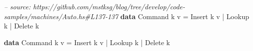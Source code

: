 \documentclass[]{article}
\newenvironment{Shaded}{}{}
\newcommand{\KeywordTok}[1]{\textcolor[rgb]{0.00,0.44,0.13}{\textbf{{#1}}}}
\newcommand{\DataTypeTok}[1]{\textcolor[rgb]{0.56,0.13,0.00}{{#1}}}
\newcommand{\CommentTok}[1]{\textcolor[rgb]{0.38,0.63,0.69}{\textit{{#1}}}}
\newcommand{\FunctionTok}[1]{\textcolor[rgb]{0.02,0.16,0.49}{{#1}}}
\newcommand{\NormalTok}[1]{{#1}}
\begin{document}
\begin{Shaded}
\begin{Highlighting}[]
\CommentTok{-- source: https://github.com/mstksg/blog/tree/develop/code-samples/machines/Auto.hs#L137-137}
\KeywordTok{data} \DataTypeTok{Command} \NormalTok{k v }\FunctionTok{=} \DataTypeTok{Insert} \NormalTok{k v }\FunctionTok{|} \DataTypeTok{Lookup} \NormalTok{k }\FunctionTok{|} \DataTypeTok{Delete} \NormalTok{k}
\end{Highlighting}
\end{Shaded}

\begin{Shaded}
\begin{Highlighting}[]
\KeywordTok{data} \DataTypeTok{Command} \NormalTok{k v }\FunctionTok{=} \DataTypeTok{Insert} \NormalTok{k v }\FunctionTok{|} \DataTypeTok{Lookup} \NormalTok{k }\FunctionTok{|} \DataTypeTok{Delete} \NormalTok{k}
\end{Highlighting}
\end{Shaded}
\end{document}
